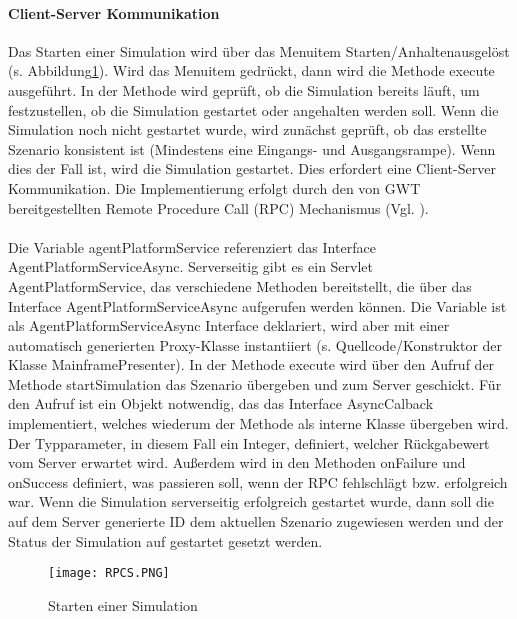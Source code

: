 \paragraph{Client-Server Kommunikation}
Das Starten einer Simulation wird über das Menuitem \glqq Starten/Anhalten\grqq ausgelöst (s. Abbildung\ref{RPCS}). Wird das Menuitem gedrückt, dann wird die Methode execute ausgeführt. In der Methode wird geprüft, ob die Simulation bereits läuft, um festzustellen, ob die Simulation gestartet oder angehalten werden soll. Wenn die Simulation noch nicht gestartet wurde, wird zunächst geprüft, ob das erstellte Szenario konsistent ist (Mindestens eine Eingangs- und Ausgangsrampe). Wenn dies der Fall ist, wird die Simulation gestartet. Dies erfordert eine Client-Server Kommunikation. Die Implementierung erfolgt durch den von GWT bereitgestellten Remote Procedure Call (RPC) Mechanismus (Vgl. \cite{gwtrpc}). 
\\\\
Die  Variable agentPlatformService referenziert das Interface AgentPlatformServiceAsync. Serverseitig gibt es ein Servlet \glqq AgentPlatformService\grqq , das verschiedene Methoden bereitstellt, die über das Interface AgentPlatformServiceAsync aufgerufen werden können. Die Variable ist als AgentPlatformServiceAsync Interface deklariert, wird aber mit einer automatisch generierten Proxy-Klasse instantiiert (s. Quellcode/Konstruktor der Klasse MainframePresenter). In der Methode execute wird über den Aufruf der Methode startSimulation das Szenario übergeben und zum Server geschickt. Für den Aufruf ist ein Objekt notwendig, das das Interface AsyncCalback implementiert, welches wiederum der Methode als interne Klasse übergeben wird. Der Typparameter, in diesem Fall ein Integer, definiert, welcher Rückgabewert vom Server erwartet wird. Außerdem wird in den Methoden onFailure und onSuccess definiert, was passieren soll, wenn der RPC fehlschlägt bzw. erfolgreich war. Wenn die Simulation serverseitig erfolgreich gestartet wurde, dann soll die auf dem Server generierte ID dem aktuellen Szenario zugewiesen werden und der Status der Simulation auf gestartet gesetzt werden.    
\begin{figure}[h!]
	\centering
		\texttt{[image: RPCS.PNG]}        
		\caption{Starten einer Simulation}
	\label{RPCS}
\end{figure}
